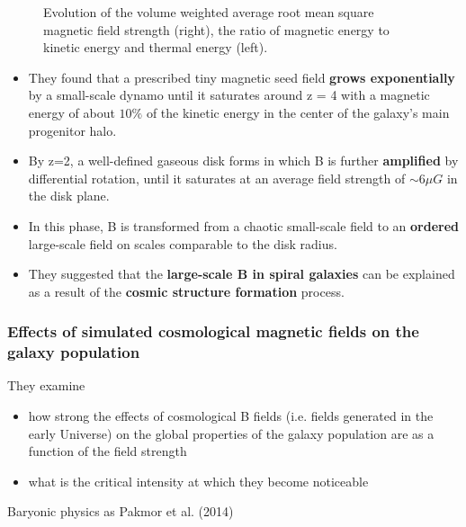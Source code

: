 \documentclass[10pt,aspectratio=169]{beamer}
\begin{document}
\begin{frame}
\begin{figure}
\begin{minipage}[b]{0.32\linewidth}
		\end{minipage}
		\caption{Evolution of the volume weighted average root mean square magnetic field strength (right), the ratio of magnetic energy to kinetic energy and thermal energy (left).}
	\end{figure}
	\begin{itemize}
		\item<1|only@1> They found that a prescribed tiny magnetic seed field \textbf{grows exponentially} by a small-scale dynamo until it saturates around z = 4 with a magnetic energy of about $10\%$ of the kinetic energy in the center of the galaxy's main progenitor halo.
		\item<2|only@2> By z=2, a well-defined gaseous disk forms in which B is further \textbf{amplified} by differential rotation, until it saturates at an average field strength of $\sim 6 \mu G$ in the disk plane.
		\item<3|only@3> In this phase, B is transformed from a chaotic small-scale field to an \textbf{ordered} large-scale field on scales comparable to the disk radius.
		\item<4|only@4> They suggested that the \textbf{large-scale B in spiral galaxies} can be explained as a result of the \textbf{cosmic structure formation} process.
	\end{itemize}
\end{frame}
\begin{frame}
	\frametitle{Effects of simulated cosmological magnetic fields on the galaxy population\\ \citep{2016MNRAS.456L..69M}}	
	They examine 
	\begin{itemize}
		\item how strong the effects of cosmological
		B fields (i.e. fields generated in the early Universe) on the global properties of the galaxy population are as a function of the field strength
		\item what is the critical intensity at which they become noticeable
	\end{itemize}
	Baryonic physics as Pakmor et al. (2014)
\end{frame}
\end{document}
